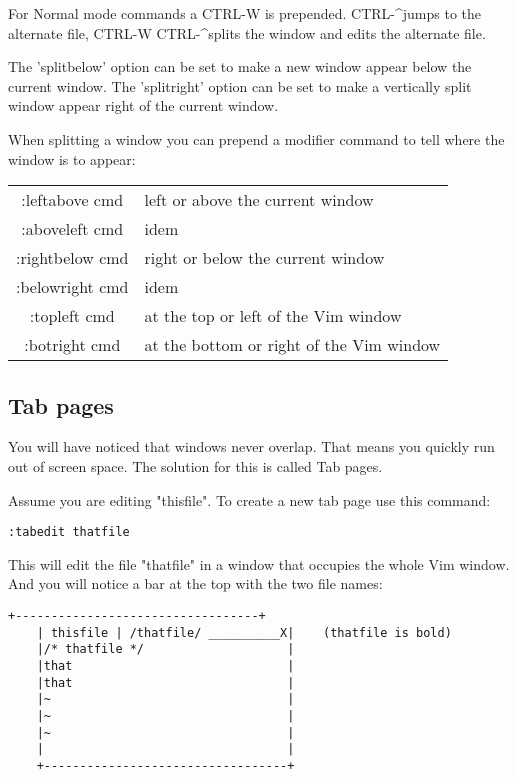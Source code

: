 For Normal mode commands a CTRL-W is prepended.
CTRL-\textasciicircum jumps to the alternate file, CTRL-W CTRL-\textasciicircum splits the window and edits the alternate file.

The 'splitbelow' option can be set to make a new window appear below the current window.
The 'splitright' option can be set to make a vertically split window appear right of the current window.

When splitting a window you can prepend a modifier command to tell where the window is to appear:
\begin{center}
				\begin{longtable}{c l}
								:leftabove {cmd} & left or above the current window \\
								:aboveleft {cmd} & idem \\
								:rightbelow {cmd} & right or below the current window \\
								:belowright {cmd} & idem \\
								:topleft {cmd} & at the top or left of the Vim window \\
								:botright {cmd} & at the bottom or right of the Vim window \\
				\end{longtable}
\end{center}
\subsection{Tab pages}
You will have noticed that windows never overlap.
That means you quickly run out of screen space.
The solution for this is called Tab pages.

Assume you are editing "thisfile".
To create a new tab page use this command:

 \begin{Verbatim}[samepage=true]
 :tabedit thatfile
 \end{Verbatim}

This will edit the file "thatfile" in a window that occupies the whole Vim window.
And you will notice a bar at the top with the two file names:

		\begin{Verbatim}[samepage=true]
    +----------------------------------+
    | thisfile | /thatfile/ __________X|    (thatfile is bold)
    |/* thatfile */                    |
    |that                              |
    |that                              |
    |~                                 |
    |~                                 |
    |~                                 |
    |                                  |
    +----------------------------------+
						\end{Verbatim}

